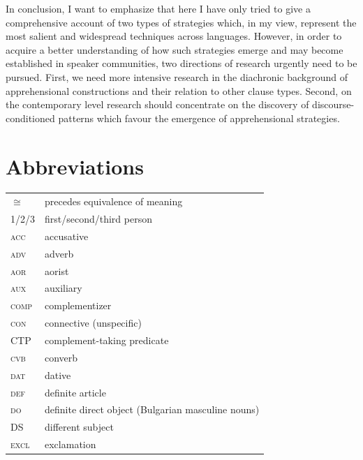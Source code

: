 \documentclass[output=paper,colorlinks,citecolor=brown]{langscibook}
\begin{document}
In conclusion, I want to emphasize that here I have only tried to give a comprehensive account of two types of strategies which, in my view, represent the most salient and widespread techniques across  languages. However, in order to acquire a better understanding of how such strategies emerge and may become established in speaker communities, two directions of research urgently need to be pursued. First, we need more intensive research in the diachronic background of apprehensional constructions and their relation to other clause types. Second, on the contemporary level research should concentrate on the discovery of discourse-conditioned patterns which favour the emergence of apprehensional strategies.

\section*{Abbreviations}
\begin{tabularx}{.45\textwidth}{lQ}
$\cong$ & precedes equivalence of meaning \\
1/2/3 & first/second/third person \\
\textsc{acc} & accusative \\
\textsc{adv} & adverb \\
\textsc{aor} & aorist \\
\textsc{aux} & auxiliary \\
\textsc{comp} & complementizer \\
\textsc{con} & connective (unspecific) \\
CTP & complement-taking predicate \\
\textsc{cvb} & converb \\
\textsc{dat} & dative \\
\textsc{def} & definite article \\
\textsc{do} & definite direct object (Bulgarian masculine nouns) \\
DS & different subject \\
\textsc{excl} & exclamation\end{tabularx}%
\end{document}
